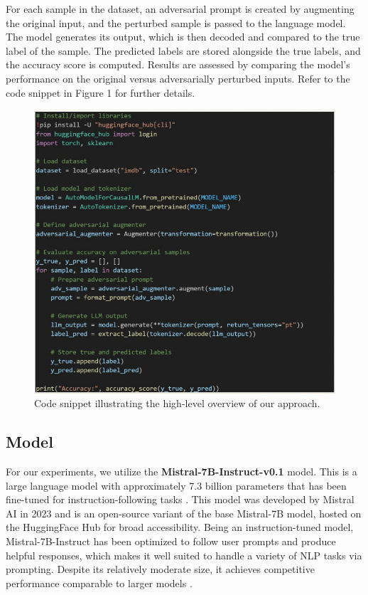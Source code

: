\documentclass[conference]{IEEEtran}
\begin{document}
For each sample in the dataset, an adversarial prompt is created by augmenting the original input, and the perturbed sample is passed to the language model. The model generates its output, which is then decoded and compared to the true label of the sample. The predicted labels are stored alongside the true labels, and the accuracy score is computed. Results are assessed by comparing the model's performance on the original versus adversarially perturbed inputs. Refer to the code snippet in Figure 1 for further details.

\begin{figure}[htbp]
    \centering
    \includegraphics[width=1\linewidth]{figures/high-level_approach.png}
    \caption{Code snippet illustrating the high-level overview of our approach.}
    \label{fig:hla}
\end{figure}

\subsection{Model}

For our experiments, we utilize the \textbf{Mistral-7B-Instruct-v0.1} model. This is a large language model with approximately 7.3 billion parameters that has been fine-tuned for instruction-following tasks \cite{mistral2023}. This model was developed by Mistral AI in 2023 and is an open-source variant of the base Mistral-7B model, hosted on the HuggingFace Hub for broad accessibility. Being an instruction-tuned model, Mistral-7B-Instruct has been optimized to follow user prompts and produce helpful responses, which makes it well suited to handle a variety of NLP tasks via prompting. Despite its relatively moderate size, it achieves competitive performance comparable to larger models \cite{mistral2023}.
\end{document}
